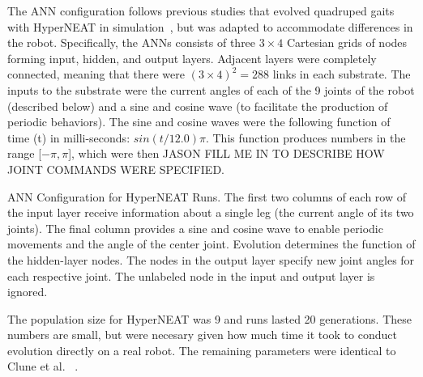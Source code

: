 \begin{itemize}
The ANN configuration follows previous studies that evolved quadruped
gaits with HyperNEAT in simulation~\cite{clune2011performance,
  clune2009evolving}, but was adapted to accommodate differences in
the robot. Specifically, the ANNs consists of three $3 \times 4$
Cartesian grids of nodes forming input, hidden, and output
layers. Adjacent layers were completely connected, meaning that there
were $(3 \times 4)^2= 288$ links in each substrate. The inputs to the
substrate were the current angles of each of the 9 joints of the robot
(described below) and a sine and cosine wave (to facilitate the
production of periodic behaviors). The sine and cosine waves were the
following function of time (t) in milli-seconds:
$sin(t/12.0)\pi$. This function produces numbers in the range [$-\pi,
  \pi$], which were then JASON FILL ME IN TO DESCRIBE HOW JOINT
COMMANDS WERE SPECIFIED.



ANN Configuration for HyperNEAT Runs. The first two columns of each
row of the input layer receive information about a single leg (the
current angle of its two joints). The final column provides a sine and
cosine wave to enable periodic movements and the angle of the center
joint. Evolution determines the function of the hidden-layer
nodes. The nodes in the output layer specify new joint angles for each
respective joint. The unlabeled node in the input and output layer is
ignored.




The population size for HyperNEAT was 9 and runs lasted 20
generations. These numbers are small, but were necesary given how much
time it took to conduct evolution directly on a real robot. The
remaining parameters were identical to Clune et
al. ~\cite{clune2011performance}.

  



\end{itemize}

